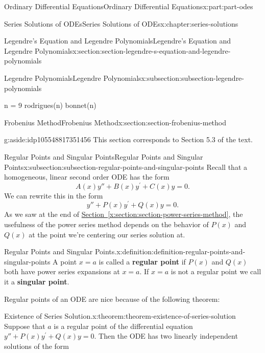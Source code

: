 \documentclass[twoside,10pt,]{book}
\newcommand{\xreffont}{\relax}
\newcommand{\terminology}[1]{\textbf{#1}}
\numberwithin{equation}{part}
\begin{document}
\begin{partptx}{Ordinary Differential Equations}{}{Ordinary Differential Equations}{}{}{x:part:part-odes}
\begin{chapterptx}{Series Solutions of ODEs}{}{Series Solutions of ODEs}{}{}{x:chapter:series-solutions}
\begin{sectionptx}{Legendre's Equation and Legendre Polynomials}{}{Legendre's Equation and Legendre Polynomials}{}{}{x:section:section-legendre-s-equation-and-legendre-polynomials}
\begin{subsectionptx}{Legendre Polynomials}{}{Legendre Polynomials}{}{}{x:subsection:subsection-legendre-polynomials}
\begin{sageinput}
n = 9
rodrigues(n)
bonnet(n)
\end{sageinput}
\end{subsectionptx}
\end{sectionptx}
%
%
\typeout{************************************************}
\typeout{************************************************}
%
\begin{sectionptx}{Frobenius Method}{}{Frobenius Method}{}{}{x:section:section-frobenius-method}
\begin{aside}{}{g:aside:idp105548817351456}%
This section corresponds to Section 5.3 of the text.%
\end{aside}
%
%
\typeout{************************************************}
\typeout{************************************************}
%
\begin{subsectionptx}{Regular Points and Singular Points}{}{Regular Points and Singular Points}{}{}{x:subsection:subsection-regular-points-and-singular-points}
Recall that a homogeneous, linear second order ODE has the form%
\begin{equation*}
A(x)y''+B(x)y^\prime+C(x)y = 0.
\end{equation*}
We can rewrite this in the form%
\begin{equation*}
y''+P(x)y^\prime+Q(x)y = 0.
\end{equation*}
As we saw at the end of \hyperref[x:section:section-power-series-method]{Section~{\xreffont\ref{x:section:section-power-series-method}}}, the usefulness of the power series method depends on the behavior of \(P(x)\) and \(Q(x)\) at the point we're centering our series solution at.%
\begin{definition}{Regular Points and Singular Points.}{x:definition:definition-regular-points-and-singular-points}%
%
A point \(x=a\) is called a \terminology{regular point} if \(P(x)\) and \(Q(x)\) both have power series expansions at \(x=a\). If \(x=a\) is not a regular point we call it a \terminology{singular point}.%
\end{definition}
Regular points of an ODE are nice because of the following theorem:%
\begin{theorem}{Existence of Series Solution.}{}{x:theorem:theorem-existence-of-series-solution}%
%
Suppose that \(a\) is a regular point of the differential equation \(y''+P(x)y^\prime+Q(x)y=0\). Then the ODE has two linearly independent solutions of the form%

\end{theorem}
\end{subsectionptx}
\end{sectionptx}
\end{chapterptx}
\end{partptx}
\end{document}
